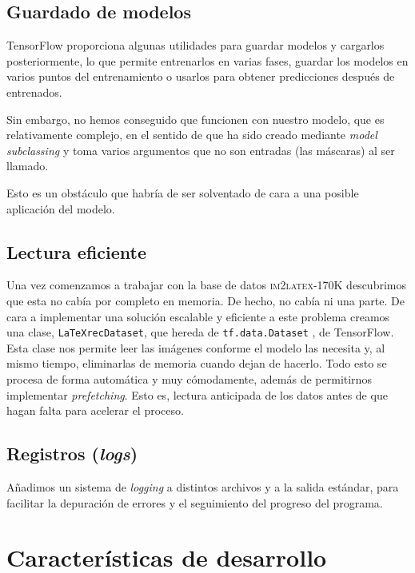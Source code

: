 \documentclass[a4paper, 20pt, dvipsnames]{article}
\begin{document}
\subsection{Guardado de modelos}

TensorFlow proporciona algunas utilidades para guardar modelos y cargarlos
posteriormente, lo que permite entrenarlos en varias fases, guardar los modelos
en varios puntos del entrenamiento o usarlos para obtener predicciones después
de entrenados.

Sin embargo, no hemos conseguido que funcionen con nuestro modelo, que es
relativamente complejo, en el sentido de que ha sido creado mediante \emph{model
  subclassing} y toma varios argumentos que no son entradas (las máscaras) al
ser llamado.

Esto es un obstáculo que habría de ser solventado de cara a una posible
aplicación del modelo.

\subsection{Lectura eficiente}

Una vez comenzamos a trabajar con la base de datos \textsc{im2latex-170K}
descubrimos que esta no cabía por completo en memoria. De hecho, no cabía ni una
parte. De cara a implementar una solución escalable y eficiente a este problema
creamos una clase, \texttt{LaTeXrecDataset}, que hereda de
\texttt{tf.data.Dataset} \cite{tf_dataset}, de TensorFlow. Esta clase nos
permite leer las imágenes conforme el modelo las necesita y, al mismo tiempo,
eliminarlas de memoria cuando dejan de hacerlo. Todo esto se procesa de forma
automática y muy cómodamente, además de permitirnos implementar
\emph{prefetching}. Esto es, lectura anticipada de los datos antes de que hagan
falta para acelerar el proceso.

\subsection{Registros (\emph{logs})}

Añadimos un sistema de \emph{logging} a distintos archivos y a la salida
estándar, para facilitar la depuración de errores y el seguimiento del progreso
del programa.


\section{Características de desarrollo}
\end{document}
